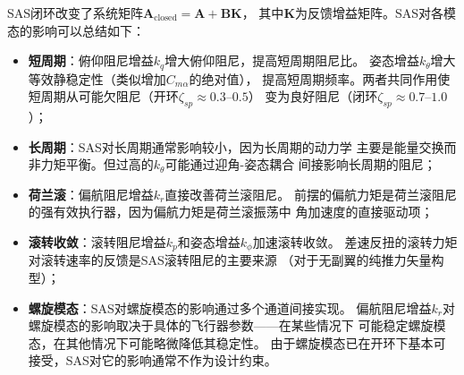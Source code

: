 \documentclass[a4paper,12pt]{ctexart}
\theoremstyle{plain}
\theoremstyle{definition}
\begin{document}
SAS闭环改变了系统矩阵$\bm{A}_{\text{closed}} = \bm{A} + \bm{B}\bm{K}$，
其中$\bm{K}$为反馈增益矩阵。SAS对各模态的影响可以总结如下：

\begin{itemize}
    \item \textbf{短周期}：俯仰阻尼增益$k_q$增大俯仰阻尼，提高短周期阻尼比。
          姿态增益$k_\theta$增大等效静稳定性（类似增加$C_{m\alpha}$的绝对值），
          提高短周期频率。两者共同作用使短周期从可能欠阻尼（开环$\zeta_{sp} \approx 0.3$--$0.5$）
          变为良好阻尼（闭环$\zeta_{sp} \approx 0.7$--$1.0$）；
    \item \textbf{长周期}：SAS对长周期通常影响较小，因为长周期的动力学
         主要是能量交换而非力矩平衡。但过高的$k_\theta$可能通过迎角-姿态耦合
         间接影响长周期的阻尼；
    \item \textbf{荷兰滚}：偏航阻尼增益$k_r$直接改善荷兰滚阻尼。
          前摆的偏航力矩是荷兰滚阻尼的强有效执行器，因为偏航力矩是荷兰滚振荡中
          角加速度的直接驱动项；
    \item \textbf{滚转收敛}：滚转阻尼增益$k_p$和姿态增益$k_\phi$加速滚转收敛。
          差速反扭的滚转力矩对滚转速率的反馈是SAS滚转阻尼的主要来源
          （对于无副翼的纯推力矢量构型）；
    \item \textbf{螺旋模态}：SAS对螺旋模态的影响通过多个通道间接实现。
          偏航阻尼增益$k_r$对螺旋模态的影响取决于具体的飞行器参数——在某些情况下
          可能稳定螺旋模态，在其他情况下可能略微降低其稳定性。
          由于螺旋模态已在开环下基本可接受，SAS对它的影响通常不作为设计约束。
\end{itemize}
\end{document}
